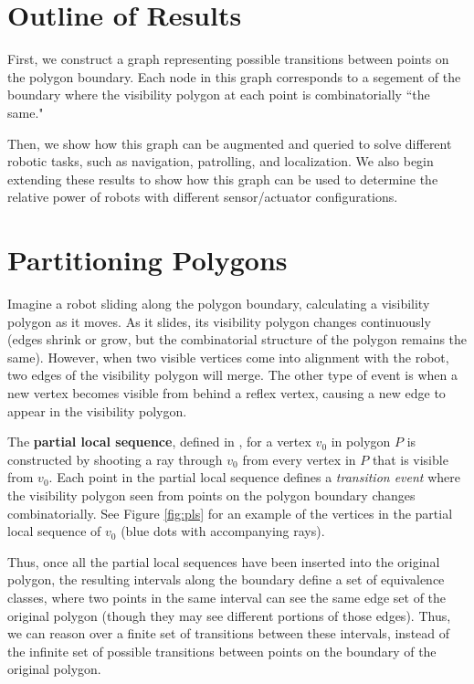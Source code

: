 \documentclass[]{styles/svproc}  %
\begin{document}
\section{Outline of Results}

First, we construct a graph representing possible transitions between points on
the polygon boundary. Each node in this graph corresponds to a segement of the
boundary where the visibility polygon at each point is combinatorially ``the
same."

Then, we show how this graph can be augmented and queried to solve different
robotic tasks, such as navigation, patrolling, and localization. We also begin
extending these results to show how this graph can be used to determine the
relative power of robots with different sensor/actuator configurations.

\section{Partitioning Polygons}

Imagine a robot sliding along the polygon boundary, calculating a visibility
polygon as it moves. As it
slides, its visibility polygon changes continuously (edges shrink or grow, but
the combinatorial structure of the polygon remains the same). However, when two
visible vertices come into alignment with the robot, two edges of the visibility polygon will
merge. The other type of event is when a new vertex becomes visible from behind
a reflex vertex, causing a new edge to appear in the visibility polygon.


The \textbf{partial local sequence}, defined in \cite{rourke_viz}, 
for a vertex $v_0$ in polygon $P$ is constructed 
by shooting a ray through $v_0$ from every vertex in $P$ that is visible from
$v_0$. Each point in the partial local
sequence defines a \emph{transition event} where the visibility polygon seen
from points on the polygon boundary changes combinatorially. See Figure \ref{fig:pls} for an example of the vertices in the partial local
sequence of $v_0$ (blue dots with accompanying rays).

Thus, once all the partial local sequences have been inserted into the original
polygon, the resulting intervals along the boundary define a set of equivalence
classes, where two points in the same interval can see the same edge set of the
original polygon (though they may see different portions of those edges). Thus,
we can reason over a finite set of transitions between these intervals, instead
of the infinite set of possible transitions between points on the boundary of
the original polygon.
\end{document}
